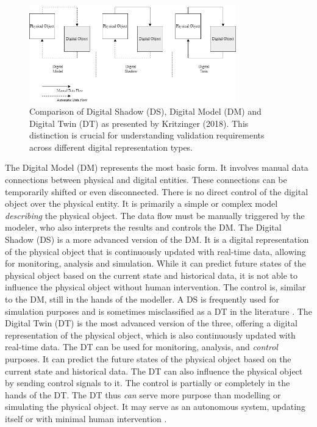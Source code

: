 \begin{figure}[htbp]
  \centering
  \includegraphics[width=0.8\textwidth]{figures/kritzinger.png}
  \caption{Comparison of Digital Shadow (DS), Digital Model (DM) and Digital Twin (DT) as presented by Kritzinger (2018). This distinction is crucial for understanding validation requirements across different digital representation types.}
  \label{fig:Kritzinger}
\end{figure}

The Digital Model (DM) represents the most basic form. It involves manual data connections between physical and digital entities. These connections can be temporarily shifted or even disconnected. There is no direct control of the digital object over the physical entity. It is primarily a simple or complex model \textit{describing} the physical object. The data flow must be manually triggered by the modeler, who also interprets the results and controls the DM.
The Digital Shadow (DS) is a more advanced version of the DM. It is a digital representation of the physical object that is continuously updated with real-time data, allowing for monitoring, analysis and simulation. While it can predict future states of the physical object based on the current state and historical data, it is not able to influence the physical object without human intervention. The control is, similar to the DM, still in the hands of the modeller. A DS is frequently used for simulation purposes and is sometimes misclassified as a DT in the literature \autocite{kritzinger2018digital,sepasgozar2021differentiating}.
The Digital Twin (DT) is the most advanced version of the three, offering a digital representation of the physical object, which is also continuously updated with real-time data. The DT can be used for monitoring, analysis, and \textit{control} purposes. It can predict the future states of the physical object based on the current state and historical data. The DT can also influence the physical object by sending control signals to it. The control is partially or completely in the hands of the DT. The DT thus \textit{can} serve more purpose than modelling or simulating the physical object. It may serve as an autonomous system, updating itself or with minimal human intervention \autocite{kritzinger2018digital}.

